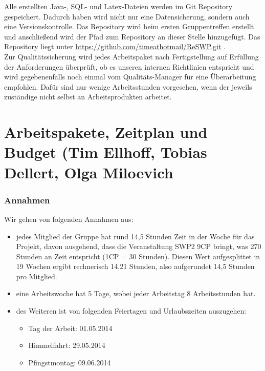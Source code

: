 \documentclass[fontsize=12pt,paper=a4,twoside]{scrartcl}
\begin{document}
Alle erstellten Java-, SQL- und Latex-Dateien werden im Git Repository gespeichert. Dadurch haben wird nicht nur eine Datensicherung, sondern auch eine Versionskontrolle. Das Repository wird beim ersten Gruppentreffen erstellt und anschließend wird der Pfad zum Repository an dieser Stelle hinzugefügt. Das Repository liegt unter \url{https://github.com/timeathotmail/ReSWP.git} .\\
Zur Qualitätssicherung wird jedes Arbeitspaket nach Fertigstellung auf Erfüllung der Anforderungen überprüft, ob es unseren internen Richtlinien entspricht und wird gegebenenfalls noch einmal vom Qualitäts-Manager für eine Überarbeitung empfohlen. Dafür sind nur wenige Arbeitsstunden vorgesehen, wenn der jeweils zuständige nicht selbst an Arbeitsprodukten arbeitet.



\section{Arbeitspakete, Zeitplan und Budget (Tim Ellhoff, Tobias Dellert, Olga Miloevich}

\subsubsection{Annahmen}\label{aps}

Wir gehen von folgenden Annahmen aus: \\
\begin{itemize}
\item jedes Mitglied der Gruppe hat rund 14,5 Stunden Zeit in der Woche für das Projekt, davon ausgehend, dass die Veranstaltung SWP2 9CP bringt, was 270 Stunden an Zeit entspricht (1CP = 30 Stunden). Diesen Wert aufgesplittet in 19 Wochen ergibt rechnerisch 14,21 Stunden, also aufgerundet 14,5 Stunden pro Mitglied.

\item eine Arbeitswoche hat 5 Tage, wobei jeder Arbeitstag 8 Arbeitsstunden hat.

\item des Weiteren ist von folgenden Feiertagen und Urlaubszeiten auszugehen:
\begin{itemize}
\item Tag der Arbeit: 01.05.2014
\item Himmelfahrt: 29.05.2014
\item Pfingstmontag: 09.06.2014
\end{itemize}
\end{itemize}
\end{document}
